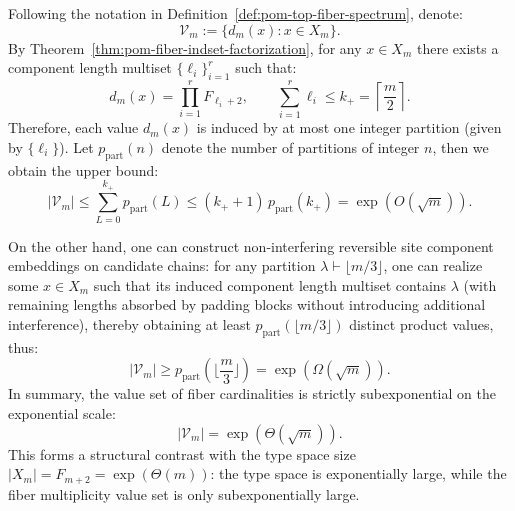 \begin{remark}\label{rem:pom-fiber-value-set-complexity}
Following the notation in Definition~\ref{def:pom-top-fiber-spectrum}, denote:
\[
\mathcal{V}_m:=\{d_m(x):x\in X_m\}.
\]
By Theorem~\ref{thm:pom-fiber-indset-factorization}, for any $x\in X_m$ there exists a component length multiset $\{\ell_i\}_{i=1}^r$ such that:
\[
d_m(x)=\prod_{i=1}^r F_{\ell_i+2},
\qquad
\sum_{i=1}^r \ell_i\le k_{+}=\left\lceil\frac{m}{2}\right\rceil.
\]
Therefore, each value $d_m(x)$ is induced by at most one integer partition (given by $\{\ell_i\}$).
Let $p_{\mathrm{part}}(n)$ denote the number of partitions of integer $n$, then we obtain the upper bound:
\[
|\mathcal{V}_m|
\le
\sum_{L=0}^{k_{+}} p_{\mathrm{part}}(L)
\le
(k_{+}+1)\,p_{\mathrm{part}}(k_{+})
=\exp(O(\sqrt m)).
\]
\par
On the other hand, one can construct non-interfering reversible site component embeddings on candidate chains: for any partition
$\lambda\vdash \bigl\lfloor m/3\bigr\rfloor$, one can realize some $x\in X_m$ such that its induced component length multiset contains $\lambda$ (with remaining lengths absorbed by padding blocks without introducing additional interference), thereby obtaining at least $p_{\mathrm{part}}(\lfloor m/3\rfloor)$ distinct product values, thus:
\[
|\mathcal{V}_m|
\ge
p_{\mathrm{part}}\!\left(\Big\lfloor\frac{m}{3}\Big\rfloor\right)
=\exp(\Omega(\sqrt m)).
\]
In summary, the value set of fiber cardinalities is strictly subexponential on the exponential scale:
\[
|\mathcal{V}_m|=\exp(\Theta(\sqrt m)).
\]
This forms a structural contrast with the type space size $|X_m|=F_{m+2}=\exp(\Theta(m))$: the type space is exponentially large, while the fiber multiplicity value set is only subexponentially large.
\end{remark}


